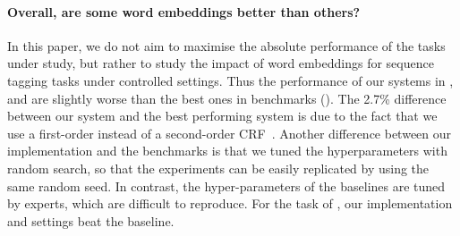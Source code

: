 \paragraph{\RQ[5] Overall, are some word embeddings better than others?}


In this paper, we do not aim to maximise the absolute performance of the tasks under 
study, but rather to study the impact of word embeddings for sequence tagging tasks under controlled settings. Thus the performance of our systems in \ner, \pos and \chunking are slightly worse than the best ones in benchmarks (). The 2.7\% difference between our \ner system and the best performing system is due to the fact that we use a first-order instead of a second-order CRF~\cite{Ando:2005}. 
Another difference between our implementation and the benchmarks is that we tuned the hyperparameters with random search, so that the experiments can be easily replicated by using the same random seed. In contrast, the hyper-parameters of the baselines are tuned by experts, which are difficult to reproduce. For the task of \mwe, our implementation and settings beat the baseline.










